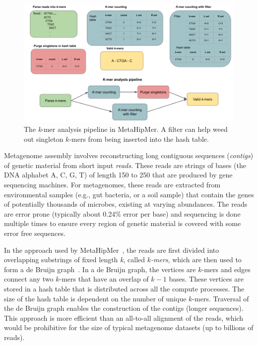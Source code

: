 \begin{figure}
    \centering
    \includegraphics[width=0.7\linewidth]{images/mhm-pipeline.png}
    \caption{The \textit{k}-mer analysis pipeline in MetaHipMer. A filter can help weed out singleton $k$-mers from being inserted into the hash table.}
    \vspace{-0.5em}
    \label{fig:mhm-kmer}
\end{figure}

Metagenome assembly involves reconstructing long contiguous sequences ({\it contigs}) of genetic material from short input {\it reads}. These reads are strings of bases (the DNA alphabet A, C, G, T) of length 150 to 250 that are produced by gene sequencing machines.  For metagenomes, these reads are extracted from environmental samples (e.g., gut bacteria, or a soil sample) that contain the genes of potentially thousands of microbes, existing at varying abundances.  The reads are error prone (typically about 0.24\% error per base) and sequencing is done multiple times to ensure every region of genetic material is covered with some error free sequences.

In the approach used by MetaHipMer~\cite{GeorganasEHG18,HofmeyrEGC20}, the reads are first divided into overlapping substrings of fixed length {\it k}, called {\it $k$-mers}, which are then used to form a de Bruijn graph~\cite{CompeauPeTe11}. In a de Bruijn graph, the vertices are $k$-mers and edges connect any two $k$-mers that have an overlap of $k-1$ bases. These vertices are stored in a hash table that is distributed across all the compute processes.  The size of the hash table is dependent on the number of unique $k$-mers.  Traversal of the de Bruijn graph enables the construction of the contigs (longer sequences).  This approach is more efficient than an all-to-all alignment of the reads, which would be prohibitive for the size of typical metagenome datasets (up to billions of reads).


